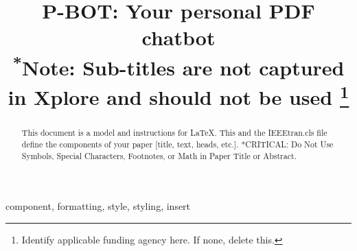 \documentclass[conference]{IEEEtran}
\begin{document}
\title{P-BOT: Your personal PDF chatbot\\
{\footnotesize \textsuperscript{*}Note: Sub-titles are not captured in Xplore and
should not be used}
\thanks{Identify applicable funding agency here. If none, delete this.}
}

\author{
\and
{}
\and
{}
}

\maketitle

\begin{abstract}
This document is a model and instructions for \LaTeX.
This and the IEEEtran.cls file define the components of your paper [title, text, heads, etc.]. *CRITICAL: Do Not Use Symbols, Special Characters, Footnotes, 
or Math in Paper Title or Abstract.
\end{abstract}

\begin{IEEEkeywords}
component, formatting, style, styling, insert
\end{IEEEkeywords}
\end{document}
